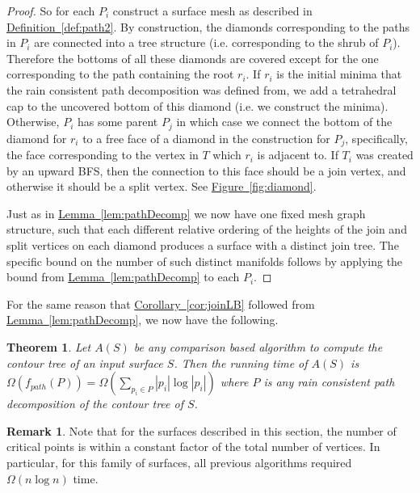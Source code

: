\documentclass[11pt]{article}
\newtheorem{theorem}{Theorem}
\theoremstyle{definition}
\newtheorem{remark}{Remark}
\newcommand{\Fig}[1]{\hyperref[fig:#1]{Figure~\ref*{fig:#1}}} %
\newcommand{\Lem}[1]{\hyperref[lem:#1]{Lemma~\ref*{lem:#1}}} %
\newcommand{\Cor}[1]{\hyperref[cor:#1]{Corollary~\ref*{cor:#1}}} %
\newcommand{\Def}[1]{\hyperref[def:#1]{Definition~\ref*{def:#1}}} %
\begin{document}
\begin{proof}
 So for each $P_i$ construct a surface mesh as described in \Def{path2}.  By construction, the diamonds corresponding to the paths in $P_i$ are connected 
 into a tree structure (i.e. corresponding to the shrub of $P_i$).  Therefore the bottoms of all these diamonds are covered except for the one corresponding 
 to the path containing the root $r_i$.  If $r_i$ is the initial minima that the rain consistent path decomposition was defined from,  
 we add a tetrahedral cap to the uncovered bottom of this diamond (i.e. we construct the minima).  Otherwise, $P_i$ has some parent $P_j$ in which case 
 we connect the bottom of the diamond for $r_i$ to a free face of a diamond in the construction for $P_j$, specifically, the face corresponding to the 
 vertex in $T$ which $r_i$ is adjacent to. 
 If $T_i$ was created by an upward BFS, then the connection to this face should be a join vertex, and otherwise it should be a split vertex.  
 See \Fig{diamond}.
 
 Just as in \Lem{pathDecomp} we now have one fixed mesh graph structure, such that each different relative ordering of the heights of the join and split vertices 
 on each diamond produces a surface with a distinct join tree.  The specific bound on the number of such distinct manifolds follows by applying the 
 bound from \Lem{pathDecomp} to each $P_i$.
\end{proof}

For the same reason that \Cor{joinLB} followed from \Lem{pathDecomp}, we now have the following. 

\begin{theorem}
 Let $A(S)$ be any comparison based algorithm to compute the contour tree of an input surface $S$.  
 Then the running time of $A(S)$ is $\Omega(f_{path}(P))=\Omega(\sum_{p_i\in P} |p_i|\log|p_i|)$ where $P$ 
 is any rain consistent path decomposition of the contour tree of $S$.
\end{theorem}

\begin{remark}
 Note that for the surfaces described in this section, the number of critical points is within a constant factor of 
 the total number of vertices.  In particular, for this family of surfaces, all previous algorithms required $\Omega(n\log n)$ time.
\end{remark}
\end{document}
